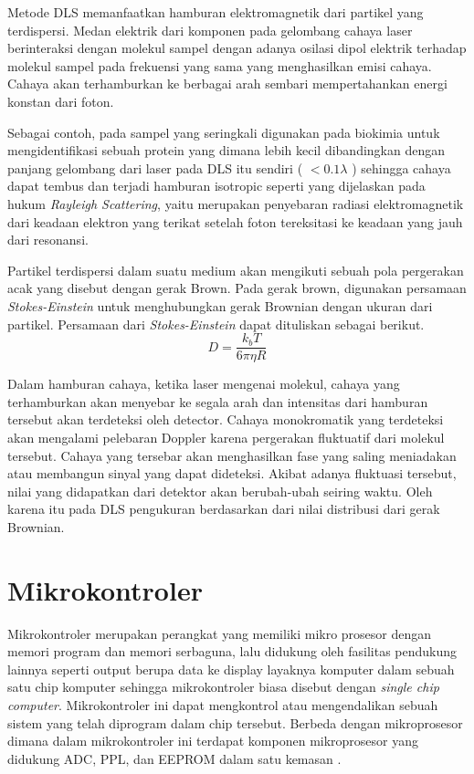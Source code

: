 Metode DLS memanfaatkan hamburan elektromagnetik dari partikel yang terdispersi. Medan elektrik
dari komponen pada gelombang cahaya laser berinteraksi dengan molekul sampel dengan adanya osilasi
dipol elektrik terhadap molekul sampel pada frekuensi yang sama yang menghasilkan emisi cahaya.
Cahaya akan terhamburkan ke berbagai arah sembari mempertahankan energi konstan dari foton. 

Sebagai contoh, pada sampel yang seringkali digunakan pada biokimia untuk mengidentifikasi sebuah
protein yang dimana lebih kecil dibandingkan dengan panjang gelombang dari laser pada DLS itu
sendiri ( $<0.1\lambda$ ) sehingga cahaya dapat tembus dan terjadi hamburan isotropic seperti yang
dijelaskan pada hukum \textit{Rayleigh Scattering}, yaitu merupakan penyebaran radiasi
elektromagnetik dari keadaan elektron yang terikat setelah foton tereksitasi ke keadaan yang jauh
dari resonansi\cite{Piazza2005}.

Partikel terdispersi dalam suatu medium akan mengikuti sebuah pola pergerakan acak yang disebut
dengan gerak Brown. Pada gerak brown, digunakan persamaan \textit{Stokes-Einstein} untuk
menghubungkan gerak Brownian dengan ukuran dari partikel\cite{Anindya2018}. Persamaan dari
\textit{Stokes-Einstein} dapat dituliskan sebagai berikut.
\begin{equation}
    D = \frac{k_b T}{6 \pi \eta R}
\end{equation}

Dalam hamburan cahaya, ketika laser mengenai molekul, cahaya yang terhamburkan akan menyebar ke
segala arah dan intensitas dari hamburan tersebut akan terdeteksi oleh detector. Cahaya monokromatik
yang terdeteksi akan mengalami pelebaran Doppler karena pergerakan fluktuatif dari molekul tersebut.
Cahaya yang tersebar akan menghasilkan fase yang saling meniadakan atau membangun sinyal yang dapat
dideteksi. Akibat adanya fluktuasi tersebut, nilai yang didapatkan dari detektor akan berubah-ubah
seiring waktu. Oleh karena itu pada DLS pengukuran berdasarkan dari nilai distribusi dari gerak
Brownian\cite{Falke2019,Pavan2022}. 




\section{Mikrokontroler}
Mikrokontroler merupakan perangkat yang memiliki mikro prosesor dengan memori program dan memori
serbaguna, lalu didukung oleh fasilitas pendukung lainnya seperti output berupa data ke display
layaknya komputer dalam sebuah satu chip komputer sehingga mikrokontroler biasa disebut dengan
\textit{single chip computer}. Mikrokontroler ini dapat mengkontrol atau mengendalikan sebuah sistem
yang telah diprogram dalam chip tersebut. Berbeda dengan mikroprosesor dimana dalam mikrokontroler
ini terdapat komponen mikroprosesor yang didukung ADC, PPL, dan EEPROM dalam satu kemasan
\cite{Sokop2016}.

